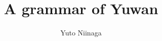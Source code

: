\author{Yuto Niinaga}
\title{A grammar of Yuwan}
\subtitle{}
\renewcommand{\lsSeries}{sidl}
\renewcommand{\lsSeriesNumber}{}
\renewcommand{\lsID}{272}
